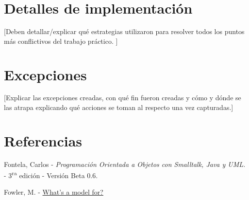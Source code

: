 \section{Detalles de implementación}

[Deben detallar/explicar qué estrategias utilizaron para resolver todos
los puntos más conflictivos del trabajo práctico. ]

\section{Excepciones}

[Explicar las excepciones creadas, con qué fin fueron creadas y cómo y
dónde se las atrapa explicando qué acciones se toman al respecto una vez
capturadas.]

\appendix
\section{Referencias}
\begingroup
\renewcommand{\section}[2]{}
\begin{thebibliography}{10}
	 Fontela, Carlos - \emph{Programación Orientada a Objetos con Smalltalk, Java y UML.} - 3\textsuperscript{ra} edición - Versión Beta 0.6.
	
	 Fowler, M. - \hyperref{https://martinfowler.com/distributedComputing/purpose.pdf}{}{}{What's a model for?}
\end{thebibliography}
\endgroup


